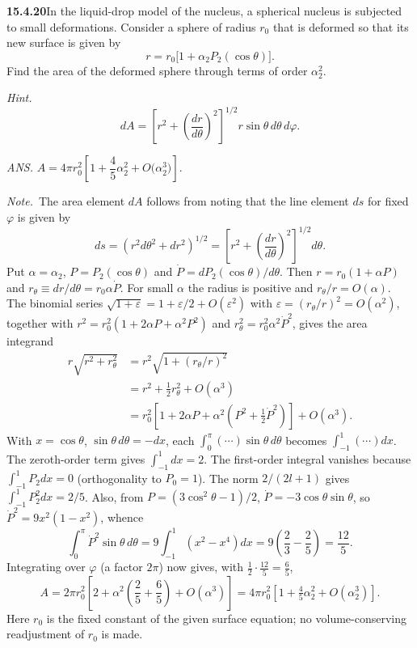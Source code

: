 \par\bigskip
\noindent\textbf{15.4.20}\quad In the liquid-drop model of the nucleus,
a spherical nucleus is subjected to small deformations. Consider a
sphere of radius $r_{0}$ that is deformed so that its new surface is
given by
\[
r=r_{0}\big[1+\alpha_{2}P_{2}(\cos\theta)\big].
\]
Find the area of the deformed sphere through terms of order
$\alpha_{2}^{2}$.
\par\emph{Hint.}
\[
dA=\left[r^{2}+\left(\frac{dr}{d\theta}\right)^{2}\right]^{1/2}
r\sin\theta\,d\theta\,d\varphi.
\]
\par\nobreak\hfill\emph{ANS.}\enspace
$A=4\pi r_{0}^{2}\left[1+\dfrac{4}{5}\alpha_{2}^{2}
+O\big(\alpha_{2}^{3}\big)\right]$.
\par\emph{Note.}~The area element $dA$ follows from noting that the
line element $ds$ for fixed $\varphi$ is given by
\[
ds=(r^{2}d\theta^{2}+dr^{2})^{1/2}
=\left[r^{2}+\left(\frac{dr}{d\theta}\right)^{2}\right]^{1/2}d\theta.
\]
\solution
Put $\alpha=\alpha_2$, $P=P_2(\cos\theta)$ and
$\dot P=dP_2(\cos\theta)/d\theta$. Then
$r=r_0(1+\alpha P)$ and $r_\theta\equiv dr/d\theta=r_0\alpha\dot P$.
For small $\alpha$ the radius is positive and $r_\theta/r=O(\alpha)$.
The binomial series $\sqrt{1+\varepsilon}=1+\varepsilon/2+O(\varepsilon^2)$
with $\varepsilon=(r_\theta/r)^2=O(\alpha^2)$, together with
$r^2=r_0^2(1+2\alpha P+\alpha^2P^2)$ and
$r_\theta^2=r_0^2\alpha^2\dot P^2$, gives the area integrand
\begin{align*}
r\sqrt{r^2+r_\theta^2}
&=r^2\sqrt{1+(r_\theta/r)^2}\\
&=r^2+\frac12r_\theta^2+O(\alpha^3)\\
&=r_0^2[1+2\alpha P+\alpha^2(P^2+\tfrac12\dot P^2)]
+O(\alpha^3).
\end{align*}
With $x=\cos\theta$, $\sin\theta\,d\theta=-dx$, each
$\int_0^\pi(\cdots)\sin\theta\,d\theta$ becomes
$\int_{-1}^1(\cdots)dx$. The zeroth-order term gives
$\int_{-1}^1dx=2$. The first-order integral vanishes because
$\int_{-1}^1P_2dx=0$ (orthogonality to $P_0=1$).
The norm $2/(2l+1)$ gives $\int_{-1}^1P_2^2dx=2/5$. Also, from
$P=(3\cos^2\theta-1)/2$,
$\dot P=-3\cos\theta\sin\theta$, so $\dot P^2=9x^2(1-x^2)$, whence
\[
\int_0^\pi\dot P^2\sin\theta\,d\theta
=9\int_{-1}^1(x^2-x^4)dx
=9\left(\frac23-\frac25\right)=\frac{12}{5}.
\]
Integrating over $\varphi$ (a factor $2\pi$) now gives, with
$\tfrac12\cdot\tfrac{12}5=\tfrac65$,
\[
A=2\pi r_0^2\left[2+\alpha^2\left(\frac25+\frac65\right)
+O(\alpha^3)\right]
=\boxed{4\pi r_0^2[1+\tfrac45\alpha_2^2+O(\alpha_2^3)]}.
\]
Here $r_0$ is the fixed constant of the given surface equation; no
volume-conserving readjustment of $r_0$ is made.

